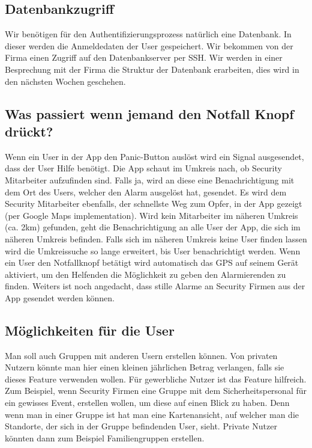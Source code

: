 \documentclass{article}
\begin{document}
\subsection{Datenbankzugriff}
Wir benötigen für den Authentifizierungsprozess natürlich eine Datenbank. In dieser werden die Anmeldedaten der User gespeichert. Wir bekommen von der Firma einen Zugriff auf den Datenbankserver per SSH. Wir werden in einer Besprechung mit der Firma die Struktur der Datenbank erarbeiten, dies wird in den nächsten Wochen geschehen.
\subsection{Was passiert wenn jemand den Notfall Knopf drückt?}
Wenn ein User in der App den Panic-Button auslöst wird ein Signal ausgesendet, dass der User Hilfe benötigt. 
Die App schaut im Umkreis nach, ob Security Mitarbeiter aufzufinden sind. 
Falls ja, wird an diese eine Benachrichtigung mit dem Ort des Users, welcher den Alarm ausgelöst hat, gesendet. 
Es wird dem Security Mitarbeiter ebenfalls, der schnellste Weg zum Opfer, in der App gezeigt (per Google Maps implementation). 
Wird kein Mitarbeiter im näheren Umkreis (ca. 2km) gefunden, geht die Benachrichtigung an alle User der App, die sich im näheren Umkreis befinden. Falls sich im näheren Umkreis keine User finden lassen wird die Umkreissuche so lange erweitert, bis User benachrichtigt werden. 
Wenn ein User den Notfallknopf betätigt wird automatisch das GPS auf seinem Gerät aktiviert, um den Helfenden die Möglichkeit zu geben den Alarmierenden zu finden.
Weiters ist noch angedacht, dass stille Alarme an Security Firmen aus der App gesendet werden können.
\subsection{Möglichkeiten für die User}
Man soll auch Gruppen mit anderen Usern erstellen können. Von privaten Nutzern könnte man hier einen kleinen jährlichen Betrag verlangen, falls sie dieses Feature verwenden wollen. Für gewerbliche Nutzer ist das Feature hilfreich. Zum Beispiel, wenn Security Firmen eine Gruppe mit dem Sicherheitspersonal für ein gewisses Event, erstellen wollen, um diese auf einen Blick zu haben. Denn wenn man in einer Gruppe ist hat man eine Kartenansicht, auf welcher man die Standorte, der sich in der Gruppe befindenden User, sieht. Private Nutzer könnten dann zum Beispiel Familiengruppen erstellen.
\end{document}
